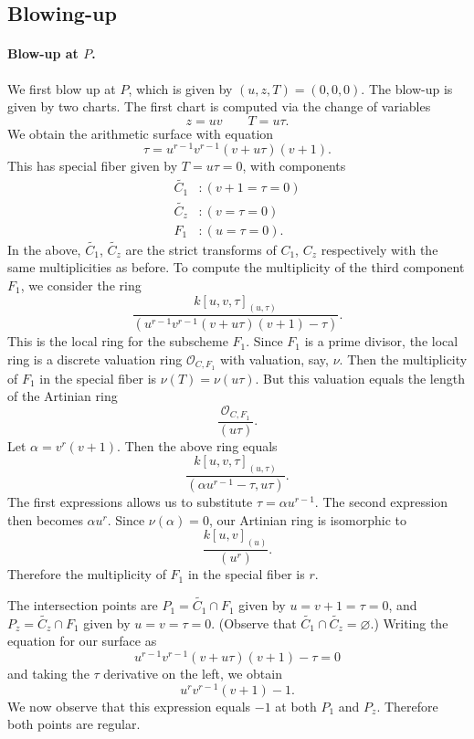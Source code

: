 \documentclass{article}
\theoremstyle{plain}
\theoremstyle{definition}
\theoremstyle{remark}
\renewcommand{\emptyset}{\varnothing}
\renewcommand{\tilde}[1]{\widetilde{#1}}
\newcommand{\sO}{\ensuremath{\mathscr{O}}}
\begin{document}
\subsection{Blowing-up}
\label{sec:blowing-up}

\paragraph{Blow-up at $P$.}
\label{sec:blow-up-P}

We first blow up at $P$, which is given by $(u,z,T) = (0,0,0)$. The blow-up is given by two charts. The first chart is computed via the change of variables
\[
z = uv \qquad T = u\tau.
\]
We obtain the arithmetic surface with equation
\[
\tau = u^{r-1}v^{r-1}(v + u\tau)(v + 1).
\]
This has special fiber given by $T = u\tau = 0$, with components
\begin{align*}
  \tilde{C_1}&: (v + 1 = \tau = 0) \\
  \tilde{C_z}&: (v = \tau = 0) \\
  F_1&: (u = \tau = 0).
\end{align*}
In the above, $\tilde{C_1}$, $\tilde{C_z}$ are the strict transforms of $C_1$, $C_z$ respectively with the same multiplicities as before. To compute the multiplicity of the third component $F_1$, we consider the ring
\[
\frac{k[u,v,\tau]_{(u,\tau)}}{(u^{r-1}v^{r-1}(v + u\tau)(v + 1) - \tau)}.
\]
This is the local ring for the subscheme $F_1$. Since $F_1$ is a prime divisor, the local ring is a discrete valuation ring $\sO_{C,F_1}$ with valuation, say, $\nu$. Then the multiplicity of $F_1$ in the special fiber is $\nu(T) = \nu(u\tau)$. But this valuation equals the length of the Artinian ring
\[
\frac{\sO_{C,F_1}}{(u\tau)}.
\]
Let $\alpha = v^{r}(v+1)$. Then the above ring equals
\[
\frac{k[u,v,\tau]_{(u,\tau)}}{(\alpha u^{r-1} - \tau, u\tau)}.
\]
The first expressions allows us to substitute $\tau = \alpha u^{r-1}$. The second expression then becomes $\alpha u^r$. Since $\nu(\alpha) = 0$, our Artinian ring is isomorphic to
\[
\frac{k[u,v]_{(u)}}{(u^r)}.
\]
Therefore the multiplicity of $F_1$ in the special fiber is $r$.

The intersection points are $P_1 = \tilde{C_1} \cap F_1$ given by $u=v+1=\tau=0$, and $P_z = \tilde{C_z} \cap F_1$ given by $u=v=\tau=0$. (Observe that $\tilde{C_1} \cap \tilde{C_z} = \emptyset$.) Writing the equation for our surface as
\[
u^{r-1}v^{r-1}(v + u\tau)(v + 1) - \tau = 0
\]
and taking the $\tau$ derivative on the left, we obtain
\[
u^rv^{r-1}(v + 1) - 1.
\]
We now observe that this expression equals $-1$ at both $P_1$ and $P_z$. Therefore both points are regular.
\end{document}
